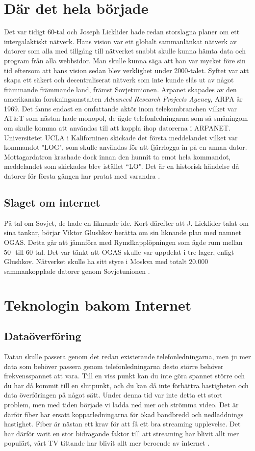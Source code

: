 \documentclass[a4paper,11pt]{article}
\begin{document}
\section{Där det hela började}
Det var tidigt 60-tal och Joseph Licklider hade redan storslagna planer om ett
intergalaktiskt nätverk. Hans vision var ett globalt sammanlänkat nätverk av
datorer som alla med tillgång till nätverket snabbt skulle kunna hämta data och
program från alla webbsidor. Man skulle kunna säga att han var mycket före sin
tid eftersom att hans vision sedan blev verklighet under 2000-talet. Syftet var
att skapa ett säkert och decentraliserat nätverk som inte kunde slås ut av något
främmande främmande land, främst Sovjetunionen. \cite{internetmuseum} Arpanet skapades av den
amerikanska forskningsanstalten \textit{Advanced Research Projects Agency,} ARPA
år 1969. Det fanns endast en omfattande aktör inom telekombranchen vilket var
AT\&T som nästan hade monopol, de ägde telefonledningarna som så småningom om
skulle komma att användas till att koppla ihop datorerna i ARPANET.
Universitetet UCLA i Kaliforninen skickade det första meddelandet vilket var
kommandot "LOG", som skulle användas för att fjärrlogga in på en annan dator.
Mottagardatron krashade dock innan den hunnit ta emot hela kommandot,
meddelandet som skickades blev istället ``LO". Det är en historisk händelse då
datorer för första gången har pratat med varandra \cite{is}.

\subsection{Slaget om internet}
På tal om Sovjet, de hade en liknande ide. Kort därefter att J. Licklider talat
om sina tankar, börjar Viktor Glushkov berätta om sin liknande plan med namnet
OGAS. Detta går att jämnföra med Rymdkapplöpningen som ägde rum mellan 50- till
60-tal. Det var tänkt att OGAS skulle var uppdelat i tre lager, enligt Glushkov.
Nätverket skulle ha sitt styre i Moskva med totalt 20.000 sammankopplade datorer
genom Sovjetunionen \cite{internetmuseum}.

\section{Teknologin bakom Internet}
\subsection{Dataöverföring}
Datan skulle passera genom det redan existerande
telefonledningarna, men ju mer data som behöver passera genom telefonledningarna
desto större behöver frekvensspannet att vara. Till en viss punkt kan du inte
göra spannet större och du har då kommit till en slutpunkt, och du kan då inte
förbättra hastigheten och data överföringen på något sätt. Under denna tid var
inte detta ett stort problem, men med tiden började vi ladda ned mer och strömma
video. Det är därför fiber har ersatt kopparledningarna för ökad bandbredd och
nedladdnings hastighet. Fiber är nästan ett krav för att få ett bra streaming
upplevelse. Det har därför varit en stor bidragande faktor till att streaming
har blivit allt mer populärt, vårt TV tittande har blivit allt mer beroende av
internet \cite{koppar}.
\end{document}
